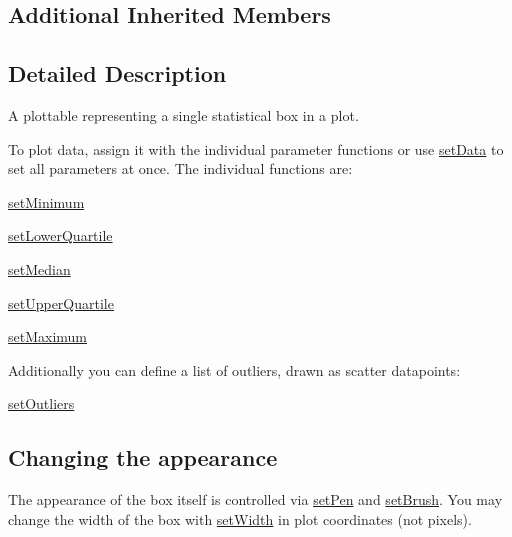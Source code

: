 \subsection*{Additional Inherited Members}


\subsection{Detailed Description}
A plottable representing a single statistical box in a plot. 



To plot data, assign it with the individual parameter functions or use \hyperlink{classQCPStatisticalBox_adf50c57b635edb12470c0e4a986aff37}{set\+Data} to set all parameters at once. The individual functions are\+: \begin{DoxyItemize}
\item \hyperlink{classQCPStatisticalBox_a84ff7cc61ba44890f0c3e0c99c19941e}{set\+Minimum} \item \hyperlink{classQCPStatisticalBox_a680941af5e23d902013962fa67223f9e}{set\+Lower\+Quartile} \item \hyperlink{classQCPStatisticalBox_a65970e77a897da4ecb4b15300868aad3}{set\+Median} \item \hyperlink{classQCPStatisticalBox_a65a1375f941c5a2077b5201229e89346}{set\+Upper\+Quartile} \item \hyperlink{classQCPStatisticalBox_acec5ad1901f00f2c5387cfb4d9787eb3}{set\+Maximum}\end{DoxyItemize}
Additionally you can define a list of outliers, drawn as scatter datapoints\+: \begin{DoxyItemize}
\item \hyperlink{classQCPStatisticalBox_af9bc09620e0bf93bf444ee35e5800d1d}{set\+Outliers}\end{DoxyItemize}
\hypertarget{classQCPStatisticalBox_appearance}{}\subsection{Changing the appearance}\label{classQCPStatisticalBox_appearance}
The appearance of the box itself is controlled via \hyperlink{classQCPAbstractPlottable_ab74b09ae4c0e7e13142fe4b5bf46cac7}{set\+Pen} and \hyperlink{classQCPAbstractPlottable_a7a4b92144dca6453a1f0f210e27edc74}{set\+Brush}. You may change the width of the box with \hyperlink{classQCPStatisticalBox_a0b62775bd67301b1eba5c785f2b26f14}{set\+Width} in plot coordinates (not pixels).


